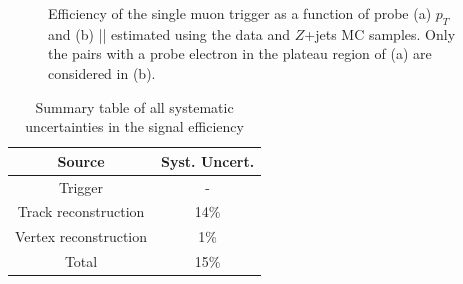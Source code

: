 \begin{figure}[!htb]
    \centering
    \caption{Efficiency of the single muon trigger as a function of probe (a) $p_{T}$ and (b) |\zzero| estimated using the data and $Z$+jets MC samples. Only the pairs with a probe electron in the plateau region of (a) are considered in (b).}
    \label{fig:MuonTrigEff1D}
\end{figure}





\begin{table}[!htb]
	\centering
	\begin{tabular}{cc}
		\hline
		\hline
		Source                              &       Syst. Uncert.       \\
		\hline
        Trigger                             &       -                   \\
        Track reconstruction                &       14\%                \\
        Vertex reconstruction               &       1\%                 \\
		\hline
        Total                               &       15\%                \\
		\hline
		\hline
	\end{tabular}
	\caption{Summary table of all systematic uncertainties in the signal efficiency}
	\label{tab:syst_total}
\end{table}


























